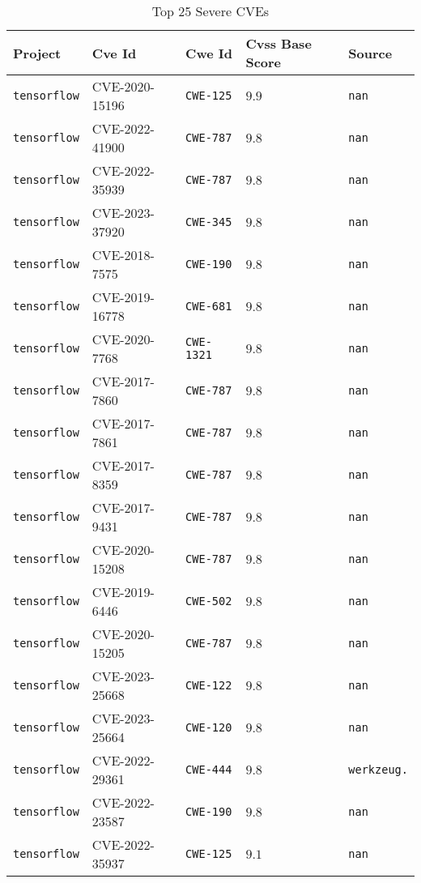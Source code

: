 \begin{table}
\caption{Top 25 Severe CVEs}
\label{tab:most-severe-cwe}
\begin{tabular}{lllll}
\toprule
Project & Cve Id & Cwe Id & Cvss Base Score & Source \\
\midrule
\texttt{tensorflow} & CVE-2020-15196 & \texttt{CWE-125} & $9.9$ & \texttt{nan} \\
\texttt{tensorflow} & CVE-2022-41900 & \texttt{CWE-787} & $9.8$ & \texttt{nan} \\
\texttt{tensorflow} & CVE-2022-35939 & \texttt{CWE-787} & $9.8$ & \texttt{nan} \\
\texttt{tensorflow} & CVE-2023-37920 & \texttt{CWE-345} & $9.8$ & \texttt{nan} \\
\texttt{tensorflow} & CVE-2018-7575 & \texttt{CWE-190} & $9.8$ & \texttt{nan} \\
\texttt{tensorflow} & CVE-2019-16778 & \texttt{CWE-681} & $9.8$ & \texttt{nan} \\
\texttt{tensorflow} & CVE-2020-7768 & \texttt{CWE-1321} & $9.8$ & \texttt{nan} \\
\texttt{tensorflow} & CVE-2017-7860 & \texttt{CWE-787} & $9.8$ & \texttt{nan} \\
\texttt{tensorflow} & CVE-2017-7861 & \texttt{CWE-787} & $9.8$ & \texttt{nan} \\
\texttt{tensorflow} & CVE-2017-8359 & \texttt{CWE-787} & $9.8$ & \texttt{nan} \\
\texttt{tensorflow} & CVE-2017-9431 & \texttt{CWE-787} & $9.8$ & \texttt{nan} \\
\texttt{tensorflow} & CVE-2020-15208 & \texttt{CWE-787} & $9.8$ & \texttt{nan} \\
\texttt{tensorflow} & CVE-2019-6446 & \texttt{CWE-502} & $9.8$ & \texttt{nan} \\
\texttt{tensorflow} & CVE-2020-15205 & \texttt{CWE-787} & $9.8$ & \texttt{nan} \\
\texttt{tensorflow} & CVE-2023-25668 & \texttt{CWE-122} & $9.8$ & \texttt{nan} \\
\texttt{tensorflow} & CVE-2023-25664 & \texttt{CWE-120} & $9.8$ & \texttt{nan} \\
\texttt{tensorflow} & CVE-2022-29361 & \texttt{CWE-444} & $9.8$ & \texttt{werkzeug.} \\
\texttt{tensorflow} & CVE-2022-23587 & \texttt{CWE-190} & $9.8$ & \texttt{nan} \\
\texttt{tensorflow} & CVE-2022-35937 & \texttt{CWE-125} & $9.1$ & \texttt{nan} \\

\end{tabular}
\end{table}
